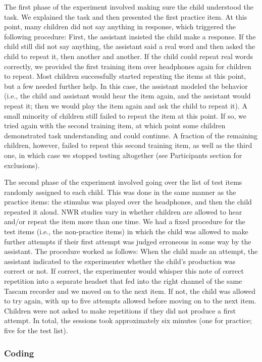 \documentclass[
  american,
  ,man,floatsintext]{apa6}
\begin{document}
The first phase of the experiment involved making sure the child understood the task. We explained the task and then presented the first practice item. At this point, many children did not say anything in response, which triggered the following procedure: First, the assistant insisted the child make a response. If the child still did not say anything, the assistant said a real word and then asked the child to repeat it, then another and another. If the child could repeat real words correctly, we provided the first training item over headphones again for children to repeat. Most children successfully started repeating the items at this point, but a few needed further help. In this case, the assistant modeled the behavior (i.e., the child and assistant would hear the item again, and the assistant would repeat it; then we would play the item again and ask the child to repeat it). A small minority of children still failed to repeat the item at this point. If so, we tried again with the second training item, at which point some children demonstrated task understanding and could continue. A fraction of the remaining children, however, failed to repeat this second training item, as well as the third one, in which case we stopped testing altogether (see Participants section for exclusions).

The second phase of the experiment involved going over the list of test items randomly assigned to each child. This was done in the same manner as the practice items: the stimulus was played over the headphones, and then the child repeated it aloud. NWR studies vary in whether children are allowed to hear and/or repeat the item more than one time. We had a fixed procedure for the test items (i.e., the non-practice items) in which the child was allowed to make further attempts if their first attempt was judged erroneous in some way by the assistant. The procedure worked as follows: When the child made an attempt, the assistant indicated to the experimenter whether the child's production was correct or not. If correct, the experimenter would whisper this note of correct repetition into a separate headset that fed into the right channel of the same Tascam recorder and we moved on to the next item. If not, the child was allowed to try again, with up to five attempts allowed before moving on to the next item. Children were not asked to make repetitions if they did not produce a first attempt. In total, the sessions took approximately six minutes (one for practice; five for the test list).

\hypertarget{coding}{%
\subsubsection{Coding}\label{coding}}
\end{document}
